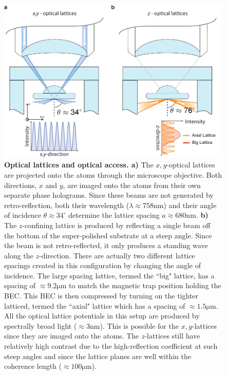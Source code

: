 \begin{figure}[t!]
		\includegraphics[width=\columnwidth]{figures/ch2/QGM/qgm_microscope_xylat_v2.pdf} 
		\caption{\textbf{Optical lattices and optical access. a)} The $x,y$-optical lattices are projected onto the atoms through the microscope objective. Both directions, $x$ and $y$, are imaged onto the atoms from their own separate phase holograms. Since these beams are not generated by retro-reflection, both their wavelength ($\lambda \approx 758\mathrm{nm}$) and their angle of incidence $\theta \approx 34^\circ$ determine the lattice spacing $a\approx 680\mathrm{nm}$. \textbf{b)} The $z$-confining lattice is produced by reflecting a single beam off the bottom of the super-polished substrate at a steep angle. Since the beam is not retro-reflected, it only produces a standing wave along the $z$-direction. There are actually two different lattice spacings created in this configuration by changing the angle of incidence. The large spacing lattice, termed the ``big" lattice, has a spacing of $\approx 9.2\mathrm{\mu m}$ to match the magnetic trap position holding the BEC. This BEC is then compressed by turning on the tighter latticed, termed the ``axial" lattice which has a spacing of $\approx 1.5 \mathrm{\mu m}$. All the optical lattice potentials in this setup are produced by spectrally broad light ($\approx 3\mathrm{nm}$). This is possible for the $x,y$-lattices since they are imaged onto the atoms. The $z$-lattices still have relatively high contrast due to the high-reflection coefficient at such steep angles and since the lattice planes are well within the coherence length ($\approx 100\mathrm{\mu m}$).}
		\label{fig:qgm_latt}	
\end{figure}

